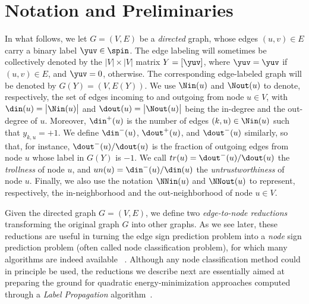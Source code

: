 \section{Notation and Preliminaries}\label{s:prel}

In what follows, we let $G=(V,E)$ be a \emph{directed} graph, whose edges $(u,v) \in E$ carry a
binary label $\yuv\in \spin$. The edge labeling will sometimes be collectively denoted by the
$|V|\times |V|$ matrix $Y = [\yuv]$, where $\yuv = \yuv$ if $(u,v) \in E$, and $\yuv = 0$,
otherwise. The corresponding edge-labeled graph will be denoted by $G(Y) = (V,E(Y))$. We use
$\Nin(u)$ and $\Nout(u)$ to denote, respectively, the set of edges incoming to and outgoing from
node $u \in V$, with $\din(u) = \big|\Nin(u)\big|$ and $\dout(u) = \big|\Nout(u)\big|$ being the
in-degree and the out-degree of $u$. Moreover, $\din^+(u)$ is the number of edges $(k,u)\in\Nin(u)$
such that $y_{k,u} = +1$. We define $\din^-(u)$, $\dout^+(u)$, and $\dout^-(u)$ similarly, so that,
for instance, $\dout^-(u)/\dout(u)$ is the fraction of outgoing edges from node $u$ whose label in
$G(Y)$ is $-1$. We call $tr(u) = \dout^-(u)/\dout(u)$ the \emph{trollness} of node $u$, and $un(u)
= \din^-(u)/\din(u)$ the \emph{untrustworthiness} of node $u$. Finally, we also use the notation
$\NNin(u)$ and $\NNout(u)$ to represent, respectively, the in-neighborhood and the out-neighborhood
of node $u \in V$.

Given the directed graph $G = (V,E)$, we define two \emph{edge-to-node reductions} transforming the
original graph $G$ into other graphs. As we see later, these reductions are useful in turning the
edge sign prediction problem into a \emph{node} sign prediction problem (often called node
classification problem), for which many algorithms are indeed available~%
\autocites{BC01}{LabelPropa03}{BDL06}{HP07}{HLP09}{Vitale2012}{HPV12}{WTA13}{HPG15}.  Although any
node classification method could in principle be used, the reductions we describe next are
essentially aimed at preparing the ground for quadratic energy-minimization approaches computed
through a \emph{Label Propagation} algorithm~\autocites{LabelPropa03}{BDL06}.

